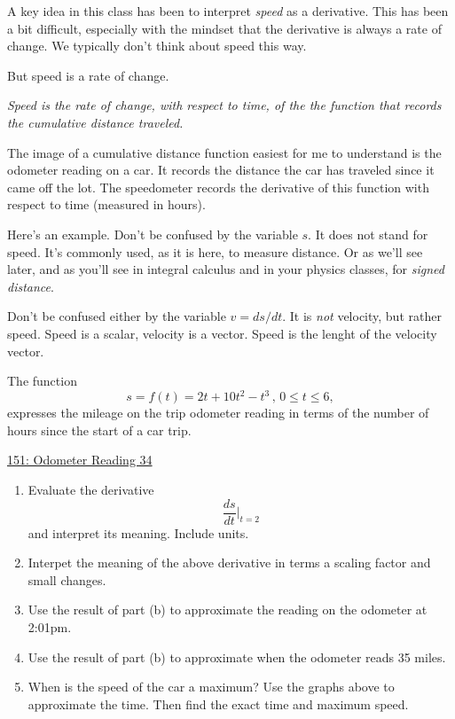 \documentclass{ximera}
\begin{document}
A key idea in this class has been to interpret \emph{speed} as a derivative. This has been a bit difficult, especially with the mindset that the derivative is always a rate of change. We typically don't think about speed this way.

But speed is a rate of change. 

\emph{Speed is the rate of change, with respect to time, of the the function that records the cumulative distance traveled.}

The image of a cumulative distance function easiest for me to understand is the odometer reading on a car. It records the distance the car has traveled since it came off the lot. The speedometer records the derivative of this function with respect to time (measured in hours). %

Here's an example. Don't be confused by the variable $s$. It does not stand for speed. It's commonly used, as it is here, to measure distance. Or as we'll see later, and as you'll see in integral calculus and in your physics classes,  for \emph{signed distance}.

Don't be confused either by the variable $v=ds/dt$. It is \emph{not} velocity, but rather speed. Speed is a scalar, velocity is a vector. Speed is the lenght of the velocity vector.

\begin{example}  \label{ExLKDremdmm}
The function
\[
    s = f(t) = 2t+10t^{2}-t^{3} \, , \, 0\leq t\leq 6 ,
\]
expresses the mileage on the trip odometer reading in terms of the number of hours since the start of a car trip.

\begin{onlineOnly}
    \begin{center}
\end{center}
\end{onlineOnly}

\href{https://www.desmos.com/calculator/t1ruocrgm4}{151: Odometer Reading 34}

\begin{enumerate}
\item Evaluate the derivative
\[
    \frac{ds}{dt}\Big|_{t=2}
\]
and interpret its meaning. Include units.

\item Interpet the meaning of the above derivative in terms a scaling factor and small changes.

\item Use the result of part (b) to approximate the reading on the odometer at 2:01pm.

\item Use the result of part (b) to approximate when the odometer reads 35 miles.

\item When is the speed of the car a maximum? Use the graphs above to approximate the time. Then find the exact time and  maximum speed.
\end{enumerate}

\end{example}
\end{document}
